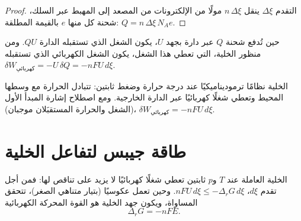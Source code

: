 \begin{proof}
التقدم $\Delta\xi$ ينقل $n\,\Delta\xi$ مولًا من الإلكترونات من
المصعد إلى المهبط عبر السلك، شحنة كل منها $e$ بالقيمة المطلقة:
$Q = n\,\Delta\xi\,N_A e$.
\end{proof}

حين تُدفع شحنة $Q$ عبر دارة بجهد $U$، يكون الشغل الذي
تستقبله الدارة $QU$. ومن منظور الخلية، التي تعطي هذا الشغل،
يكون الشغل الكهربائي الذي تستقبله $\delta W_{\text{كهربائي}} = -U\,\delta Q = -nFU\,
d\xi$.

\begin{omfigure}

{\small الخلية نظامًا ترموديناميكيًا عند درجة حرارة وضغط ثابتين:
تتبادل الحرارة مع وسطها المحيط وتعطي شغلًا كهربائيًا عبر
الدارة الخارجية. ومع اصطلاح إشارة المبدأ الأول (الشغل والحرارة
المستقبَلان موجبان)، $\delta W_{\text{كهربائي}} = -nFU\,d\xi$.}
\end{omfigure}

\section{طاقة جيبس لتفاعل الخلية}

\begin{theorem}\label{thm:b2:cell-thermodynamics:delta-g-nfe}
الخلية العاملة عند $T$ و$p$ ثابتين تعطي شغلًا كهربائيًا لا يزيد على
تناقص  لها: فمن أجل تقدم $d\xi$،
$nFU\,d\xi \leq -\Delta_r G\,d\xi$. وحين تعمل عكوسيًا (بتيار
متناهي الصغر)، تتحقق المساواة، ويكون جهد الخلية هو
القوة المحركة الكهربائية
\[
  \Delta_r G = -nFE .
\]
\end{theorem}

